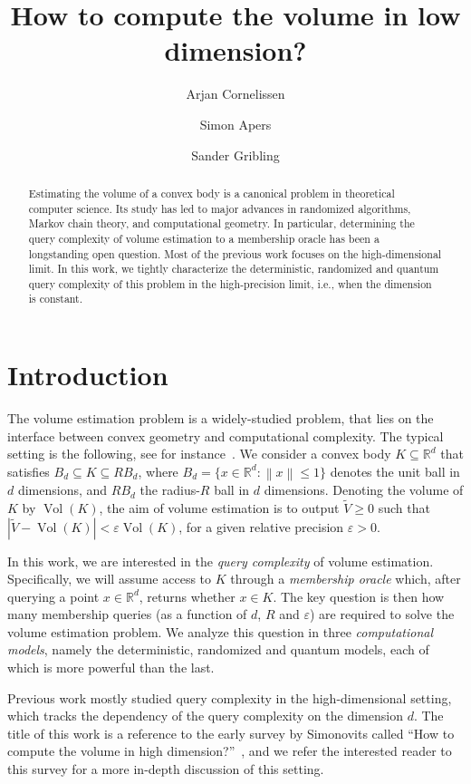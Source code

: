 \documentclass[11pt]{article}
\title{How to compute the volume in low dimension?}
\author[1,2]{Arjan Cornelissen}
\author[1]{Simon Apers}
\author[3]{Sander Gribling}
\affil[1]{Universit\'e Paris Cit\'e, CNRS, IRIF, Paris, France}
\affil[2]{Simons Institute, UC Berkeley, California, USA}
\affil[3]{Tilburg University, Tilburg, the Netherlands}
\newcommand{\R}{\ensuremath{\mathbb{R}}}
\newcommand{\norm}[1]{\ensuremath{\left\|#1\right\|}}
\DeclareMathOperator{\Vol}{Vol}
\begin{document}
    \maketitle

    \begin{abstract}
        Estimating the volume of a convex body is a canonical problem in theoretical computer science. Its study has led to major advances in randomized algorithms, Markov chain theory, and computational geometry. In particular, determining the query complexity of volume estimation to a membership oracle has been a longstanding open question. Most of the previous work focuses on the high-dimensional limit. In this work, we tightly characterize the deterministic, randomized and quantum query complexity of this problem in the high-precision limit, i.e., when the dimension is constant.
    \end{abstract}

    \section{Introduction}

    The volume estimation problem is a widely-studied problem, that lies on the interface between convex geometry and computational complexity. The typical setting is the following, see for instance~\cite{simonovits2003compute}. We consider a convex body $K \subseteq \R^d$ that satisfies $B_d \subseteq K \subseteq RB_d$, where $B_d = \{x \in \R^d : \norm{x} \leq 1\}$ denotes the unit ball in $d$ dimensions, and $R B_d$ the radius-$R$ ball in $d$ dimensions. Denoting the volume of $K$ by $\Vol(K)$, the aim of volume estimation is to output $\widetilde{V} \geq 0$ such that $|\widetilde{V} - \Vol(K)| < \varepsilon\Vol(K)$, for a given relative precision $\varepsilon > 0$.

    In this work, we are interested in the \emph{query complexity} of volume estimation. Specifically, we will assume access to $K$ through a \textit{membership oracle} which, after querying a point $x \in \R^d$, returns whether $x \in K$. The key question is then how many membership queries (as a function of $d$, $R$ and $\varepsilon$) are required to solve the volume estimation problem. We analyze this question in three \textit{computational models}, namely the deterministic, randomized and quantum models, each of which is more powerful than the last.

    Previous work mostly studied query complexity in the high-dimensional setting, which tracks the dependency of the query complexity on the dimension $d$. The title of this work is a reference to the early survey by Simonovits called ``How to compute the volume in high dimension?''~\cite{simonovits2003compute}, and we refer the interested reader to this survey for a more in-depth discussion of this setting.
\end{document}
